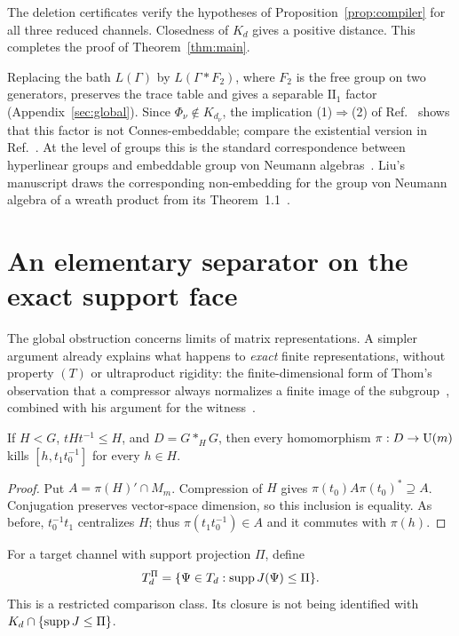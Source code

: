 \documentclass[11pt]{article}
\begin{document}
The deletion certificates verify the hypotheses of Proposition~\ref{prop:compiler} for all
three reduced channels. Closedness of $K_d$ gives a positive distance. This completes the
proof of Theorem~\ref{thm:main}.

Replacing the bath $L(\Gamma)$ by $L(\Gamma*F_2)$, where $F_2$ is the free group on two
generators, preserves the trace table and gives a separable $\mathrm{II}_1$ factor
(Appendix~\ref{sec:global}). Since $\Phi_\nu\notin K_{d_\nu}$, the implication (1)$\Rightarrow$(2) of
Ref.~\cite[Theorem~3.6]{hm15} shows that this factor is not Connes-embeddable; compare the
existential version in Ref.~\cite[Corollary~3.11]{musat}. At the level of groups this is the standard correspondence between hyperlinear groups and
embeddable group von Neumann algebras~\cite[Proposition~7.1]{ozawa}. Liu's manuscript draws
the corresponding non-embedding for the group von Neumann algebra of a wreath product from its
Theorem~1.1~\cite{liu}.

\section{An elementary separator on the exact support face}\label{sec:support}

The global obstruction concerns limits of matrix representations. A simpler argument
already explains what happens to \emph{exact} finite representations, without property $(T)$
or ultraproduct rigidity: the finite-dimensional form of Thom's observation that a compressor
always normalizes a finite image of the subgroup~\cite[Remark~4.4]{thom}, combined with his
argument for the witness~\cite[Section~5.2]{thom}.

\begin{lemma}\label{lem:finite}
If $H<G$, $tHt^{-1}\le H$, and $D=G*_HG$, then every homomorphism
$\pi:D\to\operatorname{U}(m)$ kills $[h,t_1t_0^{-1}]$ for every $h\in H$.
\end{lemma}
\begin{proof}
Put $A=\pi(H)'\cap M_m$. Compression of $H$ gives
$\pi(t_0)A\pi(t_0)^*\supseteq A$. Conjugation preserves vector-space dimension, so this
inclusion is equality. As before, $t_0^{-1}t_1$ centralizes $H$; thus
$\pi(t_1t_0^{-1})\in A$ and it commutes with $\pi(h)$.
\end{proof}

For a target channel with support projection $\Pi$, define
\[
 T_d^\Pi=\{\Psi\in T_d:\operatorname{supp} J(\Psi)\le\Pi\}.
\]
This is a restricted comparison class. Its closure is not being identified with
$K_d\cap\{\operatorname{supp} J\le\Pi\}$.
\end{document}
